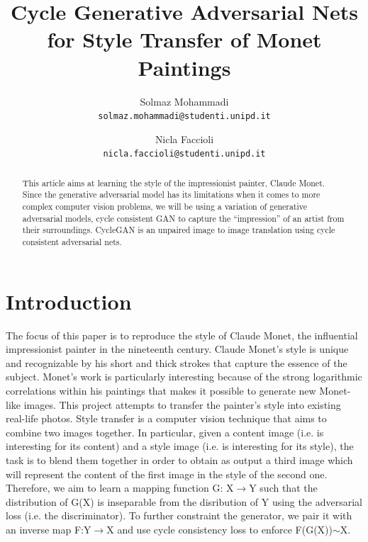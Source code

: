 \documentclass[10pt,twocolumn,letterpaper]{article}
\begin{document}
\title{Cycle Generative Adversarial Nets for Style Transfer of Monet Paintings}

\author{Solmaz Mohammadi\\
{\tt\small solmaz.mohammadi@studenti.unipd.it}
\and
Nicla Faccioli\\
{\tt\small nicla.faccioli@studenti.unipd.it}
}

\maketitle

\begin{abstract}
This article aims at learning the style of the impressionist
painter, Claude Monet. Since the generative adversarial
model has its limitations when it comes to more complex
computer vision problems, we will be using a variation
of generative adversarial models, cycle consistent GAN to capture the
“impression” of an artist from their surroundings. CycleGAN is an unpaired image to image translation using cycle consistent adversarial nets.
\end{abstract}

\section{Introduction}
The focus of this paper is to reproduce the style of Claude Monet, the
influential impressionist painter in the nineteenth century. Claude Monet’s style is unique and recognizable by his short and thick strokes that capture the essence of the subject. Monet’s work is particularly interesting because of the strong logarithmic correlations within his paintings that makes it possible to generate new Monet-like images. \cite{monetlog}
This project attempts to transfer the painter's style into existing real-life photos. Style transfer is a computer vision technique that aims to combine two images together. In particular, given a content image (i.e. is interesting for its content) and a style image (i.e. is interesting for its style), the task is to blend them together in order to obtain as output a third image which will represent the content of the first image in the style of the second one. Therefore, we aim to learn a mapping function G: X$\longrightarrow$Y such that the distribution of G(X) is inseparable from the disribution of Y using the adversarial loss (i.e. the discriminator). To further constraint the generator, we pair it with an inverse map F:Y$\longrightarrow$X and use cycle consistency loss to enforce F(G(X))$\sim$X. \cite{cyclegan}
\end{document}

